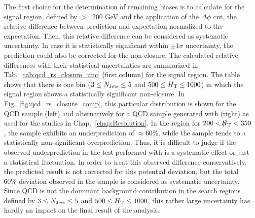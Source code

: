The first choice for the determination of remaining biases is to calculate for the signal region, defined by \MHT $>$~200 GeV and the application of the $\Delta \phi$ cut, the relative difference between prediction and expectation normalized to the expectation. Then, this relative difference can be considered as systematic uncertainty. In case it is statistically significant within $\pm 1\sigma$ uncertainty, the prediction could also be corrected for the non-closure. The calculated relative differences with their statistical uncertainties are summarized in Tab.~\ref{tab:qcd_rs_closure_unc} (first column) for the signal region. The table shows that there is one bin ($3 \leq N_{\text{Jets}} \leq 5$ and $500 \leq H_{\text{T}} \leq 1000$\gev) in which the signal region shows a statistically significant non-closure. In Fig.~\ref{fig:qcd_rs_closure_comp}, this particular distribution is shown for the \madgraph QCD sample (left) and alternatively for a QCD sample generated with \pythia (right) as used for the studies in Chap.~\ref{chap:Resolution}. In the region for $200 < \slash\mkern-12mu{H}_{\text{T}} < 350$\gev, the \madgraph sample exhibits an underprediction of $\approx 60\%$, while the \pythia sample tends to a statistically non-significant overprediction. Thus, it is difficult to judge if the observed underprediction in the test performed with \madgraph is a systematic effect or just a statistical fluctuation. In order to treat this observed difference conservatively, the predicted result is not corrected for this potential deviation, but the total 60\% deviation observed in the \madgraph sample is considered as systematic uncertainty. Since QCD is not the dominant background contribution in the search regions defined by $3 \leq N_{\text{Jets}} \leq 5$ and $500 \leq H_{\text{T}} \leq 1000$\gev, this rather large uncertainty has hardly an impact on the final result of the analysis.
